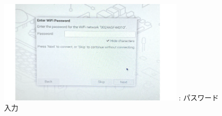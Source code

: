 \documentclass[a4paper,12pt]{jarticle}
\begin{document}
\begin{enumerate}
\begin{itemize}
                      \begin{figure}[h]
                        \centering
                        \begin{minipage}{5.228cm}
                          {\upshape
                            \includegraphics[width=9.000cm]{pswd_image_0404.png}
                            \newline
                            {\theFigure\label{seq:refFigure17}}:
                            パスワード入力}
                        \end{minipage}
                      \end{figure}
                      
                \end{itemize}  
   \clearpage

\end{enumerate}
\end{document}
